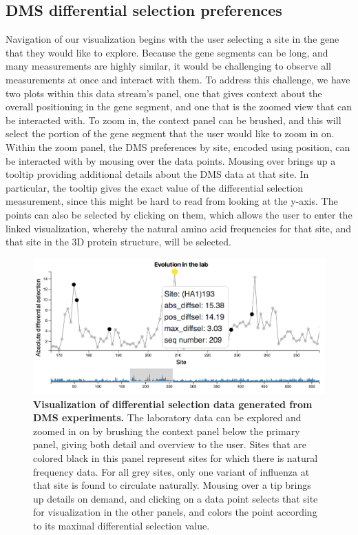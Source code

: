 \documentclass[sigchi, nonacm]{acmart}
\begin{document}
\subsection{DMS differential selection preferences}
Navigation of our visualization begins with the user selecting a site in the gene that they would like to explore.
Because the gene segments can be long, and many measurements are highly similar, it would be challenging to observe all measurements at once and interact with them.
To address this challenge, we have two plots within this data stream's panel, one that gives context about the overall positioning in the gene segment, and one that is the zoomed view that can be interacted with.
 To zoom in, the context panel can be brushed, and this will select the portion of the gene segment that the user would like to zoom in on.
Within the zoom panel, the DMS preferences by site, encoded using position, can be interacted with by mousing over the data points.
Mousing over brings up a tooltip providing additional details about the DMS data at that site.
In particular, the tooltip gives the exact value of the differential selection measurement, since this might be hard to read from looking at the y-axis.
The points can also be selected by clicking on them, which allows the user to enter the linked visualization, whereby the natural amino acid frequencies for that site, and that site in the 3D protein structure, will be selected.

\begin{figure}[h]
	\includegraphics[width=\columnwidth]{dms-brushed-tooltip.png}
	\caption{\textbf{Visualization of differential selection data generated from DMS experiments.}
  The laboratory data can be explored and zoomed in on by brushing the context panel below the primary panel, giving both detail and overview to the user.
Sites that are colored black in this panel represent sites for which there is natural frequency data.
For all grey sites, only one variant of influenza at that site is found to circulate naturally.
Mousing over a tip brings up details on demand, and clicking on a data point selects that site for visualization in the other panels, and colors the point according to its maximal differential selection value.
	}
	\label{dms-data}
\end{figure}
\end{document}
